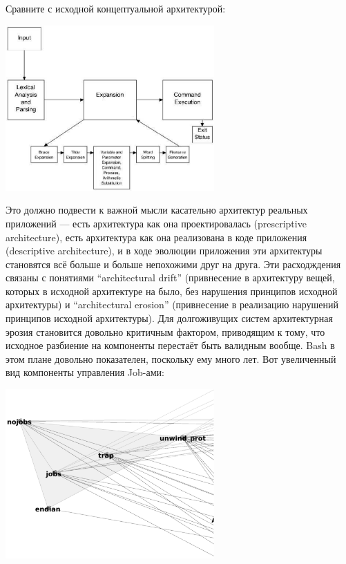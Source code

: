 \documentclass[a5paper]{article}
\begin{document}
Сравните с исходной концептуальной архитектурой:

\begin{center}
	\includegraphics[width=0.6\textwidth]{bashArchitecture.png}
\end{center}

Это должно подвести к важной мысли касательно архитектур реальных приложений --- есть архитектура как она проектировалась (prescriptive architecture), есть архитектура как она реализована в коде приложения (descriptive architecture), и в ходе эволюции приложения эти архитектуры становятся всё больше и больше непохожими друг на друга. Эти расходждения связаны с понятиями ``architectural drift'' (привнесение в архитектуру вещей, которых в исходной архитектуре на было, без нарушения принципов исходной архитектуры) и ``architectural erosion'' (привнесение в реализацию нарушений принципов исходной архитектуры). Для долгоживущих систем архитектурная эрозия становится довольно критичным фактором, приводящим к тому, что исходное разбиение на компоненты перестаёт быть валидным вообще. Bash в этом плане довольно показателен, поскольку ему много лет. Вот увеличенный вид компоненты управления Job-ами:

\begin{center}
	\includegraphics[width=0.6\textwidth]{bashJobControl.png}
\end{center}
\end{document}
